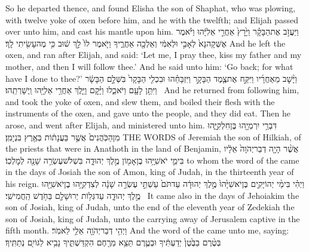 {So he departed thence, and found Elisha the son of Shaphat, who was plowing, with twelve yoke of oxen before him, and he with the twelfth; and Elijah passed over unto him, and cast his mantle upon him.}
{וַיַּעֲזֹ֣ב אֶת\maqqaf הַבָּקָ֗ר וַיָּ֙רׇץ֙ אַחֲרֵ֣י אֵלִיָּ֔הוּ וַיֹּ֗אמֶר אֶשְּׁקָה\maqqaf נָּא֙ לְאָבִ֣י וּלְאִמִּ֔י וְאֵלְכָ֖ה אַחֲרֶ֑יךָ וַיֹּ֤אמֶר לוֹ֙ לֵ֣ךְ שׁ֔וּב כִּ֥י מֶה\maqqaf עָשִׂ֖יתִי לָֽךְ׃}
{And he left the oxen, and ran after Elijah, and said: ‘Let me, I pray thee, kiss my father and my mother, and then I will follow thee.’ And he said unto him: ‘Go back; for what have I done to thee?’}
{וַיָּ֨שׇׁב מֵאַחֲרָ֜יו וַיִּקַּ֣ח אֶת\maqqaf צֶ֧מֶד הַבָּקָ֣ר וַיִּזְבָּחֵ֗הוּ וּבִכְלִ֤י הַבָּקָר֙ בִּשְּׁלָ֣ם הַבָּשָׂ֔ר וַיִּתֵּ֥ן לָעָ֖ם וַיֹּאכֵ֑לוּ וַיָּ֗קׇם וַיֵּ֛לֶךְ אַחֲרֵ֥י אֵלִיָּ֖הוּ וַֽיְשָׁרְתֵֽהוּ׃ \petucha }
{And he returned from following him, and took the yoke of oxen, and slew them, and boiled their flesh with the instruments of the oxen, and gave unto the people, and they did eat. Then he arose, and went after Elijah, and ministered unto him.}
\newperek
{}
\label{haft_42}
\setcounter{chap}{1}
\setcounter{verse}{1}
{דִּבְרֵ֥י יִרְמְיָ֖הוּ בֶּן\maqqaf חִלְקִיָּ֑הוּ מִן\maqqaf הַכֹּֽהֲנִים֙ אֲשֶׁ֣ר בַּעֲנָת֔וֹת בְּאֶ֖רֶץ בִּנְיָמִֽן׃}
{THE WORDS of Jeremiah the son of Hilkiah, of the priests that were in Anathoth in the land of Benjamin,}
{אֲשֶׁ֨ר הָיָ֤ה דְבַר\maqqaf יְהֹוָה֙ אֵלָ֔יו בִּימֵ֛י יֹאשִׁיָּ֥הוּ בֶן\maqqaf אָמ֖וֹן מֶ֣לֶךְ יְהוּדָ֑ה בִּשְׁלֹשׁ\maqqaf עֶשְׂרֵ֥ה שָׁנָ֖ה לְמׇלְכֽוֹ׃}
{to whom the word of the \lord\space came in the days of Josiah the son of Amon, king of Judah, in the thirteenth year of his reign.}
{וַיְהִ֗י בִּימֵ֨י יְהוֹיָקִ֤ים בֶּן\maqqaf יֹאשִׁיָּ֙הוּ֙ מֶ֣לֶךְ יְהוּדָ֔ה עַד\maqqaf תֹּם֙ עַשְׁתֵּ֣י עֶשְׂרֵ֣ה שָׁנָ֔ה לְצִדְקִיָּ֥הוּ בֶן\maqqaf יֹאשִׁיָּ֖הוּ מֶ֣לֶךְ יְהוּדָ֑ה עַד\maqqaf גְּל֥וֹת יְרוּשָׁלַ֖͏ִם בַּחֹ֥דֶשׁ הַֽחֲמִישִֽׁי׃ \petucha }
{It came also in the days of Jehoiakim the son of Josiah, king of Judah, unto the end of the eleventh year of Zedekiah the son of Josiah, king of Judah, unto the carrying away of Jerusalem captive in the fifth month.}
{וַיְהִ֥י דְבַר\maqqaf יְהֹוָ֖ה אֵלַ֥י לֵאמֹֽר׃}
{And the word of the \lord\space came unto me, saying:}
{בְּטֶ֨רֶם  בַבֶּ֙טֶן֙ יְדַעְתִּ֔יךָ וּבְטֶ֛רֶם תֵּצֵ֥א מֵרֶ֖חֶם הִקְדַּשְׁתִּ֑יךָ נָבִ֥יא לַגּוֹיִ֖ם נְתַתִּֽיךָ׃}
